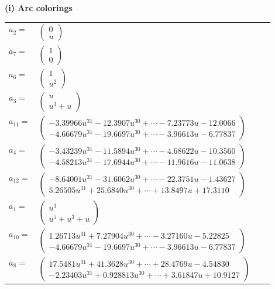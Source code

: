 \documentclass[1p]{elsarticle_modified}
\theoremstyle{definition}
\begin{document}
\flushleft \textbf{(i) Arc colorings}\\
\begin{tabular}{m{7pt} m{180pt} m{7pt} m{180pt} }
\flushright $a_{2}=$&$\begin{pmatrix}0\\u\end{pmatrix}$ \\
\flushright $a_{7}=$&$\begin{pmatrix}1\\0\end{pmatrix}$ \\
\flushright $a_{6}=$&$\begin{pmatrix}1\\u^2\end{pmatrix}$ \\
\flushright $a_{3}=$&$\begin{pmatrix}u\\u^3+u\end{pmatrix}$ \\
\flushright $a_{11}=$&$\begin{pmatrix}-3.39966 u^{31}-12.3907 u^{30}+\cdots-7.23773 u-12.0066\\-4.66679 u^{31}-19.6697 u^{30}+\cdots-3.96613 u-6.77837\end{pmatrix}$ \\
\flushright $a_{4}=$&$\begin{pmatrix}-3.43239 u^{31}-11.5894 u^{30}+\cdots-4.68622 u-10.3560\\-4.58213 u^{31}-17.6944 u^{30}+\cdots-11.9616 u-11.0638\end{pmatrix}$ \\
\flushright $a_{12}=$&$\begin{pmatrix}-8.64001 u^{31}-31.6062 u^{30}+\cdots-22.3751 u-1.43627\\5.26505 u^{31}+25.6840 u^{30}+\cdots+13.8497 u+17.3110\end{pmatrix}$ \\
\flushright $a_{1}=$&$\begin{pmatrix}u^3\\u^5+u^3+u\end{pmatrix}$ \\
\flushright $a_{10}=$&$\begin{pmatrix}1.26713 u^{31}+7.27904 u^{30}+\cdots-3.27160 u-5.22825\\-4.66679 u^{31}-19.6697 u^{30}+\cdots-3.96613 u-6.77837\end{pmatrix}$ \\
\flushright $a_{8}=$&$\begin{pmatrix}17.5481 u^{31}+41.3628 u^{30}+\cdots+28.4769 u-4.54830\\-2.23403 u^{31}+0.928813 u^{30}+\cdots+3.61847 u+10.9127\end{pmatrix}$ \\

\end{tabular}
\end{document}

